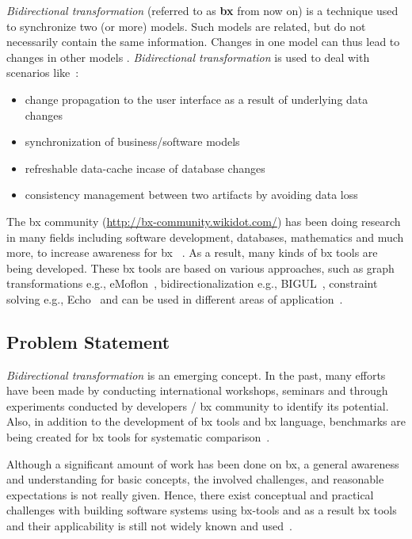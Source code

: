 \textit{Bidirectional transformation} (referred to as \textbf{bx} from now on) is a technique used to synchronize two (or more) models. Such models are related, but do not necessarily contain the same information. Changes in one model can thus lead to changes in other models \cite{bx-grace}.
\newline\newline\textit{Bidirectional transformation} is used to deal with scenarios like~\cite{bx-theoryandappl}:\\

\begin{itemize}
	\item {change propagation to the user interface as a result of underlying data changes}	
	\item {synchronization of business/software models}
	\item {refreshable data-cache incase of database changes}
	\item {consistency management between two artifacts by avoiding data loss}
\end{itemize}

The bx community (\url{http://bx-community.wikidot.com/}) has been doing research in many fields including software development, databases, mathematics and much more, to increase awareness for bx ~\cite{bx-grace}\cite{bx-dagstuhl}. As a result, many kinds of bx tools are being developed. These bx tools are based on various approaches, such as graph transformations e.g., eMoflon~\cite{emoflon-part4}, bidirectionalization e.g., BIGUL~\cite{bigul}, constraint solving e.g., Echo~\cite{echo} and can be used in different areas of application~\cite{bx-community}.

\subsection{Problem Statement}\label{subsec:probstmt}
\textit{Bidirectional transformation} is an emerging concept. In the past, many efforts have been made by conducting international workshops, seminars and through experiments conducted by developers / bx community to identify its potential. Also, in addition to the development of bx tools and bx language, benchmarks are being created for bx tools for systematic comparison~\cite{benchmark-BX}.

Although a significant amount of work has been done on bx, a general awareness and understanding for basic concepts, the involved challenges, and reasonable expectations is not really given. Hence, there exist conceptual and practical challenges with building software systems using bx-tools and as a result bx tools and their applicability is still not widely known and used~\cite{bx-theoryandappl}.

